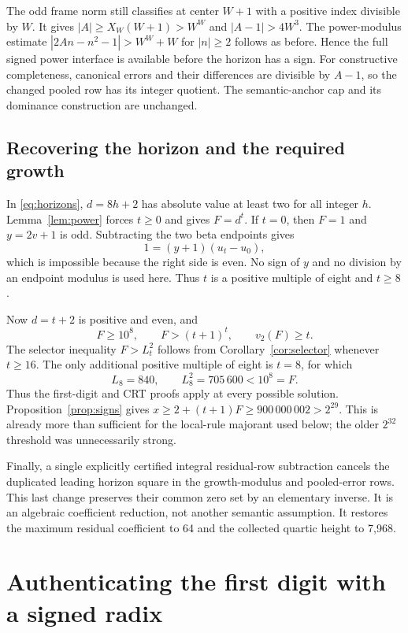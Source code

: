 \documentclass[11pt]{article}
\theoremstyle{remark}\newtheorem{remark}[theorem]{Remark}
\begin{document}
The odd frame norm still classifies at center $W+1$ with a positive
index divisible by $W$. It gives
$|A|\ge X_W(W+1)>W^W$ and $|A-1|>4W^3$. The power-modulus estimate
$|2An-n^2-1|>W^W+W$ for $|n|\ge2$ follows as before. Hence the full
signed power interface is available before the horizon has a sign.
For constructive completeness, canonical errors and their differences
are divisible by $A-1$, so the changed pooled row has its integer
quotient. The semantic-anchor cap and its dominance construction are
unchanged.

\subsection{Recovering the horizon and the required growth}

In \eqref{eq:horizons}, $d=8h+2$ has absolute value at least two for
all integer $h$. Lemma~\ref{lem:power} forces $t\ge0$ and gives
$F=d^t$. If $t=0$, then $F=1$ and $y=2v+1$ is odd. Subtracting the
two beta endpoints gives
\[
                    1=(y+1)(u_t-u_0),
\]
which is impossible because the right side is even. No sign of $y$
and no division by an endpoint modulus is used here. Thus $t$ is a
positive multiple of eight and $t\ge8$.

Now $d=t+2$ is positive and even, and
\[
 F\ge10^8,
 \qquad F>(t+1)^t,
 \qquad v_2(F)\ge t.
\]
The selector inequality $F>L_t^2$ follows from
Corollary~\ref{cor:selector} whenever $t\ge16$. The only additional
positive multiple of eight is $t=8$, for which
\[
       L_8=840,\qquad L_8^2=705\,600<10^8=F.
\]
Thus the first-digit and CRT proofs apply at every possible solution.
Proposition~\ref{prop:signs} gives
$x\ge2+(t+1)F\ge900\,000\,002>2^{29}$. This is already more than
sufficient for the local-rule majorant used below; the older
$2^{32}$ threshold was unnecessarily strong.

Finally, a single explicitly certified integral residual-row subtraction
cancels the duplicated leading horizon square in the growth-modulus
and pooled-error rows. This last change preserves their common zero
set by an elementary inverse. It is an algebraic coefficient reduction,
not another semantic assumption. It restores the maximum residual
coefficient to 64 and the collected quartic height to 7,968.

\section{Authenticating the first digit with a signed radix}
\end{document}
